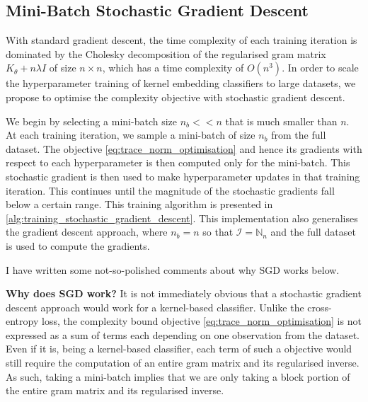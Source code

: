 \documentclass{article}
\newcommand{\note}[1]{{\color{orange} #1}}
\begin{document}
	\subsection{Mini-Batch Stochastic Gradient Descent}
	\label{sec:stochastic_gradient_descent}

		With standard gradient descent, the time complexity of each training iteration is dominated by the Cholesky decomposition of the regularised gram matrix $K_{\theta} + n \lambda I$ of size $n \times n$, which has a time complexity of $O(n^{3})$. In order to scale the hyperparameter training of kernel embedding classifiers to large datasets, we propose to optimise the complexity objective with stochastic gradient descent.
		
		We begin by selecting a mini-batch size $n_{b} << n$ that is much smaller than $n$. At each training iteration, we sample a mini-batch of size $n_{b}$ from the full dataset. The objective \eqref{eq:trace_norm_optimisation} and hence its gradients with respect to each hyperparameter is then computed only for the mini-batch. This stochastic gradient is then used to make hyperparameter updates in that training iteration. This continues until the magnitude of the stochastic gradients fall below a certain range. This training algorithm is presented in \cref{alg:training_stochastic_gradient_descent}. This implementation also generalises the gradient descent approach, where $n_{b} = n$ so that $\mathcal{I} = \mathbb{N}_{n}$ and the full dataset is used to compute the gradients.
		
		\note{I have written some not-so-polished comments about why SGD works below.}
		
		\textbf{Why does SGD work?} It is not immediately obvious that a stochastic gradient descent approach would work for a kernel-based classifier. Unlike the cross-entropy loss, the complexity bound objective \eqref{eq:trace_norm_optimisation} is not expressed as a sum of terms each depending on one observation from the dataset. Even if it is, being a kernel-based classifier, each term of such a objective would still require the computation of an entire gram matrix and its regularised inverse. As such, taking a mini-batch implies that we are only taking a block portion of the entire gram matrix and its regularised inverse.
		
\end{document}
